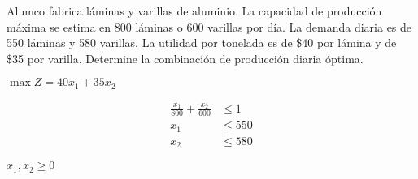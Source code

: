 \question
  \label{act:taha_02-02A-06}
  Alumco fabrica láminas y varillas de aluminio. La capacidad de producción máxima se estima en 800 láminas o 600 varillas por día. La demanda diaria es de 550 láminas y 580 varillas. La utilidad por tonelada es de \$40 por lámina y de \$35 por varilla. Determine la
combinación de producción diaria óptima.


\begin{solution}

  {\centering
    $\max Z = 40x_1 + 35x_2$
    
      \begin{align*}
        \frac{x_1}{800} + \frac{x_2}{600} &\leq 1\\
        x_1 &\leq 550\\
        x_2 &\leq 580
      \end{align*}

    $x_1, x_2 \geq 0$
  \par}
\end{solution}


